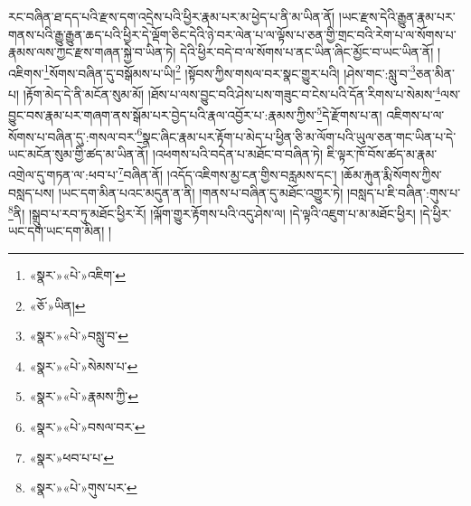 རང་བཞིན་ཐ་དད་པའི་རྫས་དག་འདྲེས་པའི་ཕྱིར་རྣམ་པར་མ་ཕྱེད་པ་ནི་མ་ཡིན་ནོ། །ཡང་རྫས་དེའི་རྒྱུན་རྣམ་པར་གནས་པའི་རྒྱུ་རྒྱུན་ཆད་པའི་ཕྱིར་དེ་ལྡོག་ཅིང་དེའི་ཉེ་བར་ལེན་པ་ལ་ལྟོས་པ་ཅན་གྱི་གྲང་བའི་རེག་པ་ལ་སོགས་པ་རྣམས་ལས་ཀྱང་རྫས་གཞན་སྐྱེ་བ་ཡིན་ཏེ། དེའི་ཕྱིར་བདེ་བ་ལ་སོགས་པ་ནང་ཡིན་ཞིང་མྱོང་བ་ཡང་ཡིན་ནོ། །འཇིགས་\footnote{«སྣར་»«པེ་»འཇིག་}སོགས་བཞིན་དུ་བསྒོམས་པ་ཡི།\footnote{«ཅོ་»ཡིན།} །སྟོབས་ཀྱིས་གསལ་བར་སྣང་གྱུར་པའི། །ཤེས་གང་:སླུ་བ་\footnote{«སྣར་»«པེ་»བསླུ་བ་}ཅན་མིན་པ། །རྟོག་མེད་དེ་ནི་མངོན་སུམ་མོ། །ཐོས་པ་ལས་བྱུང་བའི་ཤེས་པས་གཟུང་བ་ངེས་པའི་དོན་རིགས་པ་སེམས་\footnote{«སྣར་»«པེ་»སེམས་པ་}ལས་བྱུང་བས་རྣམ་པར་གཞག་ནས་སྒོམ་པར་བྱེད་པའི་རྣལ་འབྱོར་པ་:རྣམས་ཀྱིས་\footnote{«སྣར་»«པེ་»རྣམས་ཀྱི་}དེ་རྫོགས་པ་ན། འཇིགས་པ་ལ་སོགས་པ་བཞིན་དུ་:གསལ་བར་\footnote{«སྣར་»«པེ་»བསལ་བར་}སྣང་ཞིང་རྣམ་པར་རྟོག་པ་མེད་པ་ཕྱིན་ཅི་མ་ལོག་པའི་ཡུལ་ཅན་གང་ཡིན་པ་དེ་ཡང་མངོན་སུམ་གྱི་ཚད་མ་ཡིན་ནོ། །འཕགས་པའི་བདེན་པ་མཐོང་བ་བཞིན་ཏེ། ཇི་ལྟར་ཁོ་བོས་ཚད་མ་རྣམ་འགྲེལ་དུ་གཏན་ལ་:ཕབ་པ་\footnote{«སྣར་»ཕབ་པ་པ་}བཞིན་ནོ། །འདོད་འཇིགས་མྱ་ངན་གྱིས་བརླམས་དང་། །ཆོམ་རྐུན་རྨི་སོགས་ཀྱིས་བསླད་པས། །ཡང་དག་མིན་པའང་མདུན་ན་ནི། །གནས་པ་བཞིན་དུ་མཐོང་འགྱུར་ཏེ། །བསླད་པ་ཇི་བཞིན་:གུས་པ་\footnote{«སྣར་»«པེ་»གུས་པར་}ནི། །སྒྲུབ་པ་རབ་ཏུ་མཐོང་ཕྱིར་རོ། །ལྐོག་གྱུར་རྟོགས་པའི་འདུ་ཤེས་ལ། །དེ་ལྟའི་འཇུག་པ་མ་མཐོང་ཕྱིར། །དེ་ཕྱིར་ཡང་དག་ཡང་དག་མིན། །

